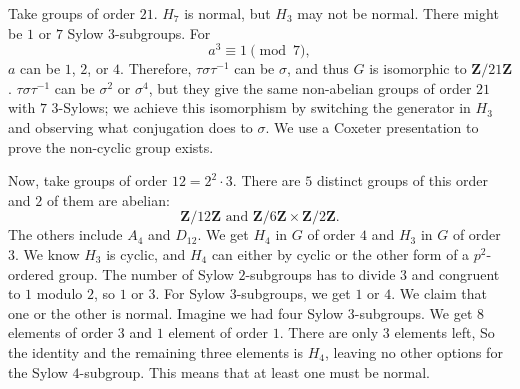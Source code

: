 \documentclass[11pt, oneside]{amsart}
\numberwithin{equation}{section}
\numberwithin{theorem}{section}
\theoremstyle{definition}
\def\Z{\mathbf{Z}}
\begin{document}
{Take groups of order $21$. $H_7$ is normal, but $H_3$ may not be normal. There might be $1$ or $7$ Sylow $3$-subgroups. For 
$$
a^3 \equiv 1\pmod 7,
$$
$a$ can be $1$, $2$, or $4$. Therefore, $\tau\sigma\tau^{-1}$ can be $\sigma$, and thus $G$ is isomorphic to $\Z/21\Z$. $\tau\sigma\tau^{-1}$ can be $\sigma^2$ or $\sigma^4$, but they give the same non-abelian groups of order $21$ with $7$ $3$-Sylows; we achieve this isomorphism by switching the generator in $H_3$ and observing what conjugation does to $\sigma$. We use a Coxeter presentation to prove the non-cyclic group exists.

Now, take groups of order $12 = 2^2\cdot 3$. There are $5$ distinct groups of this order and $2$ of them are abelian:
$$
\Z/12\Z \textrm{ and } \Z/6\Z\times \Z/2\Z. %
$$
The others include $A_4$ and $D_{12}$. We get $H_4 $ in $G$ of order $4$ and $H_3$ in $G$ of order $3$. We know $H_3$ is cyclic, and $H_4$ can either by cyclic or the other form of a $p^2$-ordered group. The number of Sylow $2$-subgroups has to divide $3$ and congruent to $1$ modulo $2$, so $1$ or $3$. For Sylow $3$-subgroups, we get $1$ or $4$. We claim that one or the other is normal. Imagine we had four Sylow $3$-subgroups. We get $8$ elements of order $3$ and $1$ element of order $1$. There are only $3$ elements left, So the identity and the remaining three elements is $H_4$, leaving no other options for the Sylow $4$-subgroup. This means that at least one must be normal.

}
\end{document}
